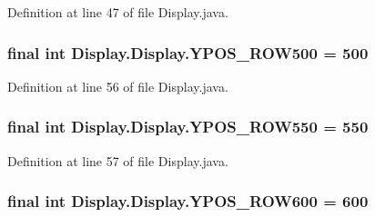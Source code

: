 Definition at line 47 of file Display.\+java.

\hypertarget{class_display_1_1_display_af69167585902297bf72bccb89eac59ad}{}
\subsubsection[{Y\+P\+O\+S\+\_\+\+R\+O\+W500}]{\setlength{\rightskip}{0pt plus 5cm}final int Display.\+Display.\+Y\+P\+O\+S\+\_\+\+R\+O\+W500 = 500\hspace{0.3cm}{\ttfamily [static]}}\label{class_display_1_1_display_af69167585902297bf72bccb89eac59ad}


Definition at line 56 of file Display.\+java.

\hypertarget{class_display_1_1_display_a18e8f506bdeb1ffce18d4e17eacfc1c9}{}
\subsubsection[{Y\+P\+O\+S\+\_\+\+R\+O\+W550}]{\setlength{\rightskip}{0pt plus 5cm}final int Display.\+Display.\+Y\+P\+O\+S\+\_\+\+R\+O\+W550 = 550\hspace{0.3cm}{\ttfamily [static]}}\label{class_display_1_1_display_a18e8f506bdeb1ffce18d4e17eacfc1c9}


Definition at line 57 of file Display.\+java.

\hypertarget{class_display_1_1_display_aeb7358eb4ef9314e129e3636eaee48b2}{}
\subsubsection[{Y\+P\+O\+S\+\_\+\+R\+O\+W600}]{\setlength{\rightskip}{0pt plus 5cm}final int Display.\+Display.\+Y\+P\+O\+S\+\_\+\+R\+O\+W600 = 600\hspace{0.3cm}{\ttfamily [static]}}\label{class_display_1_1_display_aeb7358eb4ef9314e129e3636eaee48b2}


